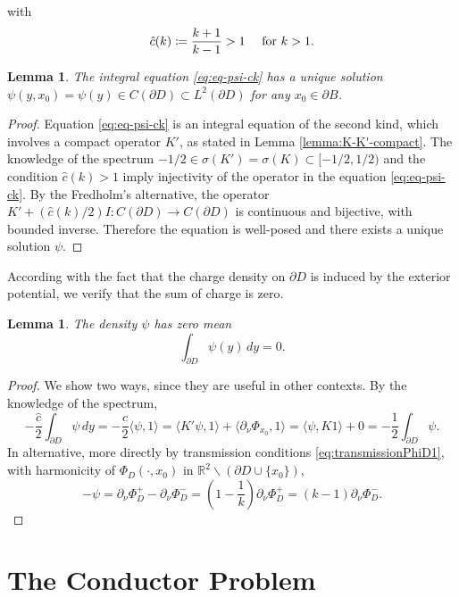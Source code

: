 \documentclass[10pt, a4paper, twoside, openright]{book}
\theoremstyle{definition}
\theoremstyle{plain}
\theoremstyle{plain}
\theoremstyle{plain}
\theoremstyle{plain}
\theoremstyle{plain}
\newtheorem{lemma}[subsection]{Lemma}
\theoremstyle{plain}
\theoremstyle{plain}
\theoremstyle{plain}
\begin{document}
with 
\begin{equation}
 \hat{c}(k)\coloneqq\dfrac{k+1}{k-1} > 1 \quad \textup{ for } k>1.
\end{equation}
\begin{lemma}
 The integral equation \eqref{eq:eq-psi-ck} has a unique solution $\psi(y,x_0)=\psi(y) \in C(\partial D) \subset L^2(\partial D)$ for any $x_0 \in \partial B$.
\end{lemma}
\begin{proof}
 Equation \eqref{eq:eq-psi-ck} is an integral equation of the second kind, which involves a compact operator $K'$, 
 as stated in Lemma \ref{lemma:K-K'-compact}. The knowledge of the spectrum $-1/2 \in \sigma(K')=\sigma(K) \subset [-1/2,1/2)$ and the condition $\hat{c}(k)>1$ imply injectivity of the operator in the equation \eqref{eq:eq-psi-ck}. 
 By the Fredholm's alternative, the operator $K'+(\hat{c}(k)/2)I:C(\partial D)\to C(\partial D)$ is continuous and bijective, with bounded inverse.
 Therefore the equation is well-posed and there exists a unique solution $\psi$.
\end{proof}
According with the fact that the charge density on $\partial D$ is induced by the exterior 
potential, we verify that the sum of charge is zero.
\begin{lemma}
 The density $\psi$ has zero mean
 \begin{equation}
  \int_{\partial D} \psi(y)\, dy = 0.
 \end{equation}
\end{lemma}
\begin{proof}
We show two ways, since they are useful in other contexts. By the knowledge of the spectrum,
 \begin{equation*}
  -\frac{\hat{c}}{2} \int_{\partial D} \psi\,dy = -\frac{\hat{c}}{2} \langle \psi,1\rangle = \langle K'\psi,1\rangle + \langle \partial_\nu\Phi_{x_0},1\rangle = \langle \psi,K 1\rangle + 0 = -\frac{1}{2}\int_{\partial D} \psi.
 \end{equation*}
 In alternative, more directly by transmission conditions \eqref{eq:transmissionPhiD1}, with harmonicity of $\Phi_D(\cdot,x_0)$ in $\mathbb{R}^2\backslash(\partial D\cup\{x_0\})$,
 \begin{equation*}
  -\psi=\partial_\nu \Phi_D^+-\partial_\nu \Phi_D^-=(1-\frac{1}{k})\partial_\nu \Phi_D^+ = (k-1)\partial_\nu \Phi_D^-.
 \end{equation*} 
\end{proof}

\section{The Conductor Problem}
\end{document}
